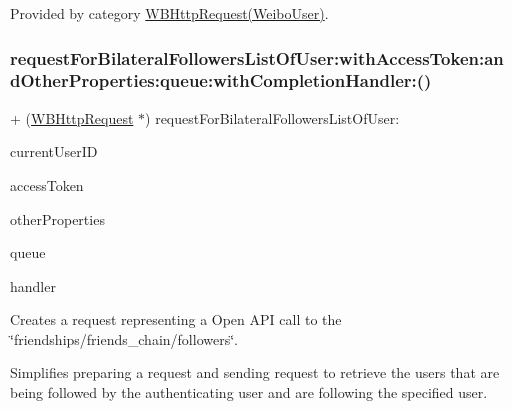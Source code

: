 Provided by category \mbox{\hyperlink{category_w_b_http_request_07_weibo_user_08_a5c4b501746e378232db99ae045e49889}{W\+B\+Http\+Request(\+Weibo\+User)}}.

\mbox{\label{interface_w_b_http_request_a5c4b501746e378232db99ae045e49889}} 
\subsubsection{\texorpdfstring{request\+For\+Bilateral\+Followers\+List\+Of\+User\+:with\+Access\+Token\+:and\+Other\+Properties\+:queue\+:with\+Completion\+Handler\+:()}{requestForBilateralFollowersListOfUser:withAccessToken:andOtherProperties:queue:withCompletionHandler:()}\hspace{0.1cm}{\footnotesize\ttfamily [2/3]}}
{\footnotesize\ttfamily + (\mbox{\hyperlink{interface_w_b_http_request}{W\+B\+Http\+Request}} $\ast$) request\+For\+Bilateral\+Followers\+List\+Of\+User\+: \begin{DoxyParamCaption}\item[{(N\+S\+String $\ast$)}]{current\+User\+ID }\item[{withAccessToken:(N\+S\+String $\ast$)}]{access\+Token }\item[{andOtherProperties:(N\+S\+Dictionary $\ast$)}]{other\+Properties }\item[{queue:(N\+S\+Operation\+Queue $\ast$)}]{queue }\item[{withCompletionHandler:(W\+B\+Request\+Handler)}]{handler }\end{DoxyParamCaption}}

Creates a request representing a Open A\+PI call to the \char`\"{}friendships/friends\+\_\+chain/followers\char`\"{}.

Simplifies preparing a request and sending request to retrieve the users that are being followed by the authenticating user and are following the specified user.

